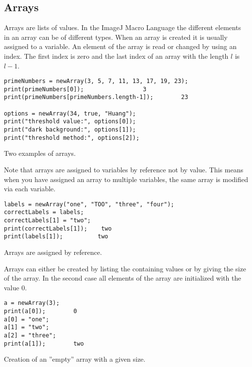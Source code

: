 \subsection{Arrays}

Arrays are lists of values. In the ImageJ Macro Language the different elements in an array can be of different types. When an array is created it is usually assigned to a variable. An element of the array is read or changed by using an index. The first index is zero and the last index of an array with the length $l$ is $l-1$. 

\begin{listing}[H]
\begin{verbatim}
primeNumbers = newArray(3, 5, 7, 11, 13, 17, 19, 23);
print(primeNumbers[0]);					3
print(primeNumbers[primeNumbers.length-1]);		   23

options = newArray(34, true, "Huang");
print("threshold value:", options[0]);
print("dark background:", options[1]);
print("threshold method:", options[2]);
\end{verbatim}
\caption{Two examples of arrays.}
\label{lst:arrays}
\end{listing}

Note that arrays are assigned to variables by reference not by value. This means when you have assigned an array to multiple variables, the same array is modified via each variable. 

\begin{listing}[H]
\begin{verbatim}
labels = newArray("one", "TOO", "three", "four");
correctLabels = labels;
correctLabels[1] = "two";
print(correctLabels[1]);	two
print(labels[1]);	       two
\end{verbatim}
\caption{Arrays are assigned by reference.}
\label{lst:arrays_assigned_by_reference}
\end{listing}

Arrays can either be created by listing the containing values or by giving the size of the array. In the second case all elements of the array are initialized with the value 0.

\begin{listing}[H]
\begin{verbatim}
a = newArray(3);
print(a[0]);		0
a[0] = "one";
a[1] = "two";
a[2] = "three";
print(a[1]);		two
\end{verbatim}
\caption{Creation of an ''empty'' array with a given size.}
\label{lst:empty_array}
\end{listing}

